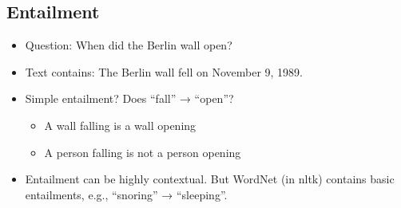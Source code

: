\documentclass[11pt]{article}
\theoremstyle{definition}
\begin{document}
\subsection{Entailment}
\begin{itemize}
  \item Question: When did the Berlin wall open?
  \item Text contains: The Berlin wall fell on November 9, 1989.
  \item Simple entailment? Does “fall” → “open”?
  \begin{itemize}
    \item A wall falling is a wall opening
    \item A person falling is not a person opening
  \end{itemize}
  \item Entailment can be highly contextual. But WordNet (in nltk)
  contains basic entailments, e.g., “snoring” → “sleeping”.
\end{itemize}
\end{document}
